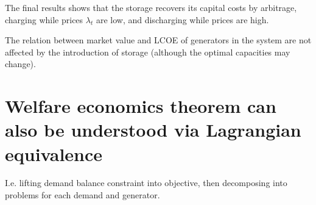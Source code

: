 \documentclass[final,3p,times]{elsarticle}
\def\l{\lambda}
\begin{document}
The final results shows that the storage recovers its capital costs by arbitrage, charging while prices $\l_t$ are low, and discharging while prices are high.

The relation between market value and LCOE of generators in the system are not affected by the introduction of storage (although the optimal capacities may change).

\section{Welfare economics theorem can also be understood via Lagrangian equivalence}

I.e. lifting demand balance constraint into objective, then decomposing into problems for each demand and generator.




\end{document}
